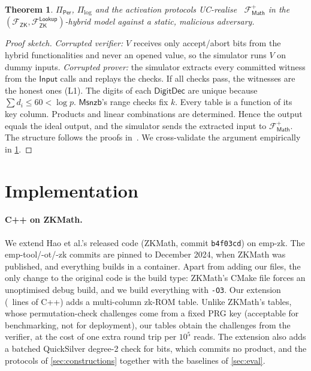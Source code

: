 \documentclass[10pt,twocolumn]{article}
\newtheorem{theorem}{Theorem}
\theoremstyle{remark}
\newcommand{\Fzk}{\mathcal{F}_{\mathsf{ZK}}}
\newcommand{\Flk}{\mathcal{F}^{\mathsf{Lookup}}_{\mathsf{ZK}}}
\newcommand{\DD}{\mathsf{DigitDec}}
\newcommand{\Msnzb}{\mathsf{Msnzb}}
\begin{document}
\begin{theorem}
$\Pi_{\mathsf{Per}}$, $\Pi_{\log}$ and the activation protocols UC-realise~\cite{canetti2001uc}
$\mathcal{F}^{+}_{\mathsf{Math}}$ in the $(\Fzk,\Flk)$-hybrid model against a static, malicious
adversary.
\end{theorem}
\begin{proof}[Proof sketch]
\emph{Corrupted verifier:} $V$ receives only accept/abort bits from the hybrid functionalities and
never an opened value, so the simulator runs $V$ on dummy inputs. \emph{Corrupted prover:} the
simulator extracts every committed witness from the $\mathsf{Input}$ calls and replays the checks.
If all checks pass, the witnesses are the honest ones (L1). The digits of each $\DD$ are unique
because $\sum d_i\le60<\log p$. $\Msnzb$'s range checks fix $k$. Every table is a function of its
key column. Products and linear combinations are determined. Hence the output equals the ideal
output, and the simulator sends the extracted input to $\mathcal{F}^{+}_{\mathsf{Math}}$. The
structure follows the proofs in~\cite[App.~B]{hao2024scalable}. We cross-validate the argument
empirically in \cref{sec:impl}.
\end{proof}



\section{Implementation}\label{sec:impl}

\paragraph{C++ on ZKMath.} We extend Hao et al.'s released code (ZKMath, commit
\texttt{b4f03cd}) on emp-zk. The emp-tool/-ot/-zk commits are pinned to December 2024, when ZKMath
was published, and everything builds in a container. Apart from adding our files, the only change to
the original code is the build type: ZKMath's CMake file forces an unoptimised debug build, and we
build everything with \texttt{-O3}. Our extension (\ExtLines\ lines of C++) adds a multi-column
zk-ROM table. Unlike
ZKMath's tables, whose permutation-check challenges come from a fixed PRG key (acceptable for
benchmarking, not for deployment), our tables obtain the challenges from the verifier, at the cost of
one extra round trip per $10^5$ reads. The extension also adds a batched QuickSilver degree-2 check
for bits, which commits no product, and the protocols of \cref{sec:constructions} together with the
baselines of \cref{sec:eval}.
\end{document}
